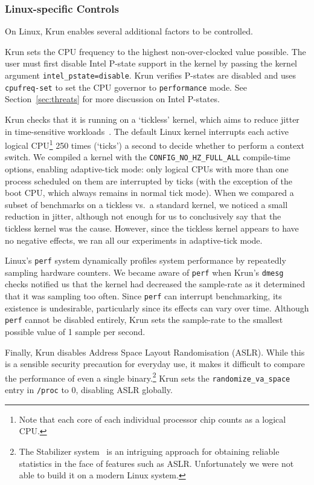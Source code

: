 \documentclass[a4paper,UKenglish]{lipics}
\newcommand{\krun}{Krun\xspace}
\begin{document}
\subsubsection{Linux-specific Controls}

On Linux, \krun enables several additional factors to be controlled.

\krun sets the CPU frequency to the highest non-over-clocked value possible.
The user must first disable Intel P-state support in
the kernel by passing the kernel argument \texttt{intel\_pstate=disable}.
\krun verifies P-states are disabled and uses \texttt{cpufreq-set} to set
the CPU governor to \texttt{performance} mode. See
Section~\ref{sec:threats} for more discussion on Intel P-states.

\krun checks that it is running on a `tickless' kernel, which aims to reduce
jitter in time-sensitive workloads~\cite{tickless}. The default
Linux kernel interrupts each active logical CPU\footnote{Note that each core of
each individual processor chip counts as a logical CPU.} 250 times (`ticks') a second to
decide whether to perform a context switch. We compiled a kernel with the
\texttt{CONFIG\_NO\_HZ\_FULL\_ALL} compile-time options, enabling adaptive-tick
mode: only logical CPUs with more than one process scheduled on them are
interrupted by ticks (with the exception of the boot CPU, which always remains
in normal tick mode).
When we compared a subset of benchmarks on a tickless vs.~a standard
kernel, we noticed a small reduction in jitter, although not enough for us to
conclusively say that the tickless kernel was the cause. However,
since the tickless kernel appears to have no negative effects, we ran all
our experiments in adaptive-tick mode.

Linux's \texttt{perf} system dynamically profiles system performance by
repeatedly sampling hardware counters. We became aware of \texttt{perf} when
\krun's \texttt{dmesg} checks notified us that the kernel had decreased the
sample-rate as it determined that it was sampling too often. Since \texttt{perf}
can interrupt benchmarking, its existence is undesirable, particularly since its
effects can vary over time. Although \texttt{perf} cannot be disabled entirely,
\krun sets the sample-rate to the smallest possible value of 1 sample per
second.

Finally, \krun disables Address Space Layout Randomisation (ASLR). While this is
a sensible security precaution for everyday use, it makes it difficult to
compare the performance of even a single binary.\footnote{The Stabilizer
system~\cite{curtsinger13stabilizer} is an intriguing approach for obtaining reliable
statistics in the face of features such as ASLR. Unfortunately we were not able
to build it on a modern Linux system.} \krun sets the
\texttt{randomize\_va\_space} entry in \texttt{/proc} to 0, disabling ASLR
globally.
\end{document}

